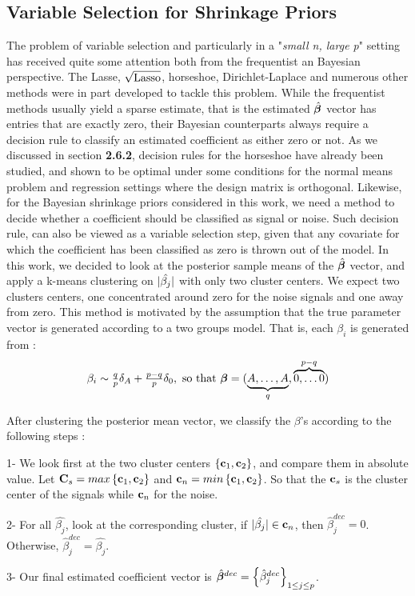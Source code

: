 \documentclass[chapters]{uamaththesis}
\begin{document}
\subsection{Variable Selection for Shrinkage Priors  }\label{k-means}
The problem of variable selection and particularly in a "\textit{small n, large p}" setting has received quite some attention both from  the frequentist an Bayesian perspective. The Lasse, $\sqrt{\text{\rm{Lasso}}}$, horseshoe, Dirichlet-Laplace and numerous other methods were in part developed to tackle this problem. While the frequentist methods usually yield a sparse estimate, that is the estimated $\hat{\boldsymbol{\beta}}$ vector has entries that are exactly zero, their Bayesian counterparts always require a decision rule to classify an estimated coefficient as either zero or not. As we discussed in section \textbf{2.6.2}, decision rules for the horseshoe have already been studied, and shown to be optimal under some conditions for the normal means problem and regression settings where the design matrix is orthogonal. Likewise, for the Bayesian shrinkage priors considered in this work, we need a method to decide whether a coefficient should be classified as signal or noise. Such decision rule, can also be viewed as a variable selection step, given that any covariate for which the coefficient has been classified as zero is thrown out of the model. In this work, we decided to look at the posterior sample means of the $\hat{\boldsymbol{\beta}}$ vector, and apply a k-means clustering on $\lvert\hat{\beta_j}\rvert $ with only two cluster centers. We expect two clusters centers, one concentrated around zero for the noise signals and one away from zero. This method is motivated by the assumption that the true parameter vector is generated according to a two groups model. That is, each $\beta_i$ is generated from : 
$$ \beta_i \sim \tfrac{q}{p} \delta_{A} + \tfrac{p-q}{p} \delta_{0}, \ \text{so that }  \boldsymbol{\beta} = ( \underbrace{ A, \ldots ,A}_{q}, \overbrace{0, \ldots 0}^{p-q} ) $$

After clustering the posterior mean vector, we classify the $\beta$'s according to the following steps : 
\ben
\item[1-] We look first at the two cluster centers $\left\lbrace {\bf c}_1 , {\bf c}_2 \right\rbrace $, and compare them in absolute value. Let ${\bf C}_s = max\left\lbrace {\bf c}_1 , {\bf c}_2 \right\rbrace$ and ${\bf c}_n = min\left\lbrace {\bf c}_1 , {\bf c}_2 \right\rbrace$. So that the ${\bf c}_s$ is the cluster center of the signals while ${\bf c}_n$ for the noise.
\item[2-] For all $\hat{\beta_j}$, look at the corresponding cluster, if $\lvert\hat{\beta_j}\rvert \in {\bf c}_n $, then $\hat{\beta}_j^{dec}= 0$. Otherwise, $\hat{\beta}_j^{dec} = \hat{\beta_j}$.
\item[3-] Our final estimated coefficient vector is $\hat{\boldsymbol{\beta}}^{dec} = \left\lbrace \hat{\beta}^{dec}_{j} \right\rbrace_{1\leq j \leq p}$.
\een
\end{document}
